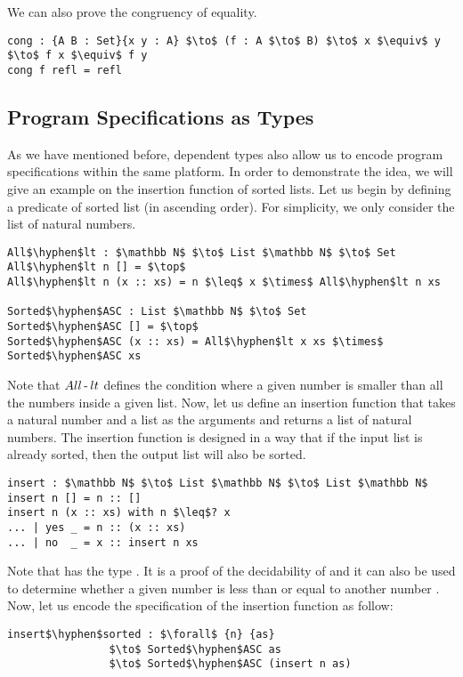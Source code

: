 \par We can also prove the congruency of equality.
\begin{lstlisting}[mathescape=true,xleftmargin=.3\textwidth]
cong : {A B : Set}{x y : A} $\to$ (f : A $\to$ B) $\to$ x $\equiv$ y $\to$ f x $\equiv$ f y
cong f refl = refl
\end{lstlisting}


\subsection{Program Specifications as Types}
\par As we have mentioned before, dependent types also allow us to encode program
specifications within the same platform. In order to demonstrate the
idea, we will give an example on the insertion function of sorted
lists. Let us begin by defining a predicate
of sorted list (in ascending order). For simplicity, we only consider the list of natural
numbers. 
\begin{lstlisting}[mathescape=true,xleftmargin=.3\textwidth]
All$\hyphen$lt : $\mathbb N$ $\to$ List $\mathbb N$ $\to$ Set
All$\hyphen$lt n [] = $\top$
All$\hyphen$lt n (x :: xs) = n $\leq$ x $\times$ All$\hyphen$lt n xs

Sorted$\hyphen$ASC : List $\mathbb N$ $\to$ Set
Sorted$\hyphen$ASC [] = $\top$
Sorted$\hyphen$ASC (x :: xs) = All$\hyphen$lt x xs $\times$ Sorted$\hyphen$ASC xs
\end{lstlisting}

\par Note that \(All\operatorname{-} lt\) defines the condition where a given
number is smaller than all the numbers inside a given list. Now, let
us define an insertion function that takes a natural number and a list as the arguments and returns a list of
natural numbers. The insertion function is designed in a way that if the
input list is already sorted, then the output list will also be sorted. 
\begin{lstlisting}[mathescape=true,xleftmargin=.3\textwidth]
insert : $\mathbb N$ $\to$ List $\mathbb N$ $\to$ List $\mathbb N$
insert n [] = n :: []
insert n (x :: xs) with n $\leq$? x
... | yes _ = n :: (x :: xs)
... | no  _ = x :: insert n xs
\end{lstlisting}

\par Note that  has the type . It is a proof of the decidability of \mb{\leq} and it can also be used to determine whether
a given number  is less than or equal to another number
. Now, let us encode the specification of the insertion function
as follow: 
\begin{lstlisting}[mathescape=true,xleftmargin=.3\textwidth]
insert$\hyphen$sorted : $\forall$ {n} {as} 
                $\to$ Sorted$\hyphen$ASC as 
                $\to$ Sorted$\hyphen$ASC (insert n as)
\end{lstlisting}

